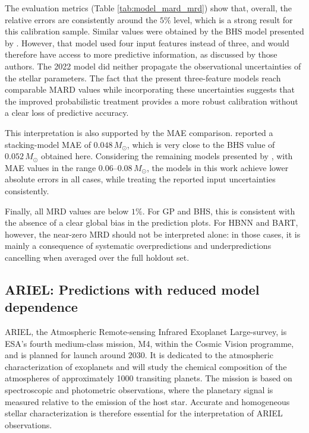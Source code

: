 

The evaluation metrics (Table \ref{tab:model_mard_mrd}) show that, overall, the relative errors are consistently around the $5\%$ level, which is a strong result for this calibration sample. Similar values were obtained by the BHS model presented by \citet{moya2022}. However, that model used four input features instead of three, and would therefore have access to more predictive information, as discussed by those authors. The 2022 model did neither propagate the observational uncertainties of the stellar parameters. The fact that the present three-feature models reach comparable MARD values while incorporating these uncertainties suggests that the improved probabilistic treatment provides a more robust calibration without a clear loss of predictive accuracy.

This interpretation is also supported by the MAE comparison. \citet{moya2022} reported a stacking-model MAE of $0.048\,M_\odot$, which is very close to the BHS value of $0.052\,M_\odot$ obtained here. Considering the remaining models presented by \citet{moya2022}, with MAE values in the range $0.06$--$0.08\,M_\odot$, the models in this work achieve lower absolute errors in all cases, while treating the reported input uncertainties consistently.

Finally, all MRD values are below $1\%$. For GP and BHS, this is consistent with the absence of a clear global bias in the prediction plots. For HBNN and BART, however, the near-zero MRD should not be interpreted alone: in those cases, it is mainly a consequence of systematic overpredictions and underpredictions cancelling when averaged over the full holdout set.

\subsection{ARIEL: Predictions with reduced model dependence} \label{subsec:dataset_b}

ARIEL, the Atmospheric Remote-sensing Infrared Exoplanet Large-survey, is ESA's fourth medium-class mission, M4, within the Cosmic Vision programme, and is planned for launch around 2030. It is dedicated to the atmospheric characterization of exoplanets and will study the chemical composition of the atmospheres of approximately 1000 transiting planets. The mission is based on spectroscopic and photometric observations, where the planetary signal is measured relative to the emission of the host star. Accurate and homogeneous stellar characterization is therefore essential for the interpretation of ARIEL observations.

